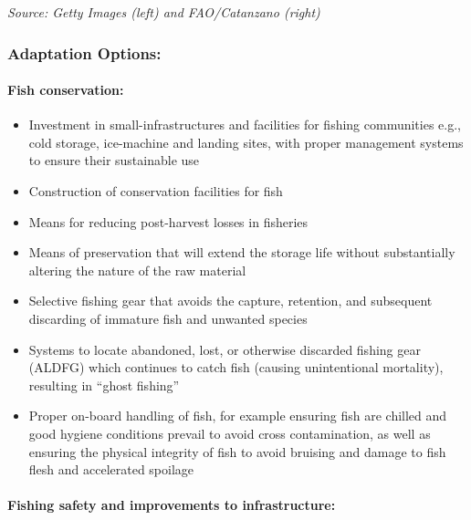 \documentclass[
]{book}
\providecommand{\tightlist}{%
  \setlength{\itemsep}{0pt}\setlength{\parskip}{0pt}}
\begin{document}
\emph{Source: Getty Images (left) and FAO/Catanzano (right) }

\hypertarget{adaptation-options-11}{%
\subsubsection{\texorpdfstring{\textbf{Adaptation Options:}}{Adaptation Options:}}\label{adaptation-options-11}}

\hypertarget{fish-conservation-1}{%
\paragraph{Fish conservation:}\label{fish-conservation-1}}

\begin{itemize}
\tightlist
\item
  Investment in small-infrastructures and facilities for fishing communities e.g., cold storage, ice-machine and landing sites, with proper management systems to ensure their sustainable use
\item
  Construction of conservation facilities for fish
\item
  Means for reducing post-harvest losses in fisheries
\item
  Means of preservation that will extend the storage life without substantially altering the nature of the raw material
\item
  Selective fishing gear that avoids the capture, retention, and subsequent discarding of immature fish and unwanted species
\item
  Systems to locate abandoned, lost, or otherwise discarded fishing gear (ALDFG) which continues to catch fish (causing unintentional mortality), resulting in ``ghost fishing''
\item
  Proper on-board handling of fish, for example ensuring fish are chilled and good hygiene conditions prevail to avoid cross contamination, as well as ensuring the physical integrity of fish to avoid bruising and damage to fish flesh and accelerated spoilage
\end{itemize}

\hypertarget{fishing-safety-and-improvements-to-infrastructure-1}{%
\paragraph{Fishing safety and improvements to infrastructure:}\label{fishing-safety-and-improvements-to-infrastructure-1}}
\end{document}
